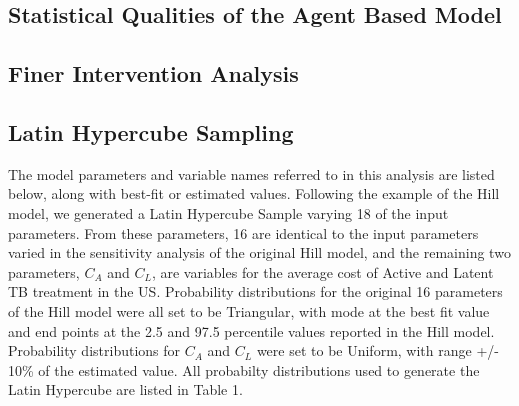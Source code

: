 \documentclass{amsart}
\begin{document}
\subsection{Statistical Qualities of the Agent Based Model}
\subsection{Finer Intervention Analysis}
\subsection{Latin Hypercube Sampling}
The model parameters and variable names referred to in this analysis are listed below, along with best-fit or estimated values.  Following the example of the Hill model, we generated a Latin Hypercube Sample varying 18 of the input parameters.  From these parameters, 16 are identical to the input parameters varied in the sensitivity analysis of the original Hill model, and the remaining two parameters, $C_{A}$ and $C_{L}$, are variables for the average cost of Active and Latent TB treatment in the US.   Probability distributions for the original 16 parameters of the Hill model were all set to be Triangular, with mode at the best fit value and end points at the 2.5 and 97.5 percentile values reported in the Hill model.  Probability distributions for $C_{A}$ and $C_{L}$ were set to be Uniform, with range +/- 10\% of the estimated value.  All probabilty distributions used to generate the Latin Hypercube are listed in Table 1.\\
\end{document}
